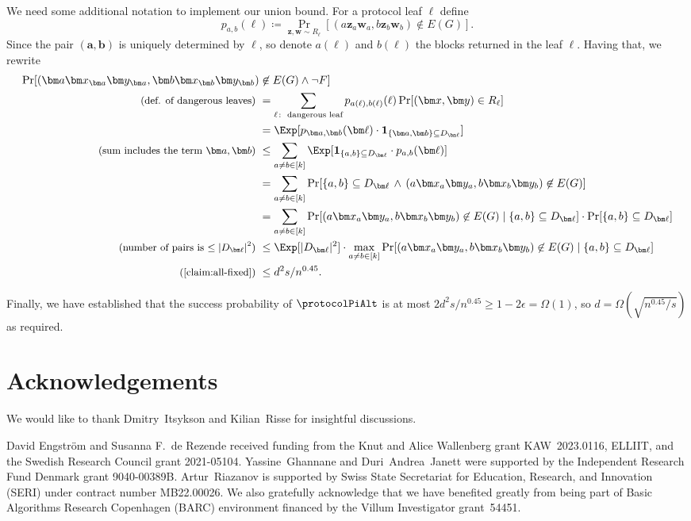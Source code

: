 We need some additional notation to implement our union bound. For a protocol leaf $\ell$ define 
\[p_{a,b}(\ell) \coloneqq \Pr_{\bm z, \bm w \sim R_\ell}[(a \bm z_{a} \bm w_{ a}, b \bm z_b \bm w_b) \not\in E(G)].\]
 Since the pair $(\bm a, \bm b)$ is uniquely determined by $\bm \ell$, so denote $a(\ell)$ and $b(\ell)$ the blocks returned in the leaf $\ell$. 
Having that, we rewrite
\begin{align*}
    \Pr[(\bm a \bm x_{\bm a} \bm y_{\bm a}, \bm b \bm x_{\bm b} \bm y_{\bm b})& \not\in E(G) \land \lnot F] \\
   \text{\small (def. of dangerous leaves) } &=
    \sum_{\ell\colon \text{ dangerous leaf}} p_{a(\ell),b(\ell)}(\ell) \Pr[(\bm x, \bm y) \in R_\ell]\\
    &=
    \Exp[p_{\bm a, \bm b}(\bm \ell) \cdot \mathbf{1}_{\{\bm a, \bm b\} \subseteq D_{\bm \ell}}]\\
   \text{\small (sum includes the term $\bm a, \bm b$) } &\le \sum_{a \neq b \in [k]} \Exp[\mathbf{1}_{\{a,b\} \subseteq D_{\bm \ell}} \cdot p_{a,b}(\bm \ell)]\\
    &= \sum_{a \neq b \in [k]} \Pr[\{a,b\} \subseteq D_{\bm \ell} \,\land\,(a \bm x_a \bm y_a, b \bm x_b \bm y_b) \not\in E(G)]\\
    &= \sum_{a \neq b \in [k]} \Pr[(a \bm x_a \bm y_a, b \bm x_b \bm y_b) \not\in E(G) \mid \{a,b\} \subseteq D_{\bm \ell}] \cdot \Pr[\{a,b\} \subseteq D_{\bm \ell}]\\
   \text{\small (number of pairs is $\le |D_{\bm\ell}|^2$) } &\le \Exp[|D_{\bm \ell}|^2] \cdot \max_{a \neq b \in [k]}  \Pr[(a \bm x_a \bm y_a, b \bm x_b \bm y_b) \not\in E(G) \mid \{a,b\} \subseteq D_{\bm \ell}] \\ 
   \text{\small (\autoref{claim:all-fixed}) }&\le d^2 s / n^{0.45}.
\end{align*}


Finally, we have established that the success probability of $\protocolPiAlt$ is at most $2 d^2 s/ n^{0.45} \ge 1 - 2\epsilon = \Omega(1)$, so $d = \Omega(\sqrt{n^{0.45} / s})$ as required.
\section*{Acknowledgements}
\label{sec:acknowledgements}
We would like to thank 
Dmitry~Itsykson and 
Kilian~Risse for insightful  
discussions.

David Engström and Susanna F.\ de Rezende received funding from the Knut and Alice Wallenberg grant \mbox{KAW 2023.0116}, ELLIIT, and the Swedish Research Council grant 
\mbox{2021-05104}.
Yassine~Ghannane and Duri~Andrea~Janett were supported by
the Independent Research Fund Denmark grant \mbox{9040-00389B}.
Artur~Riazanov is supported by Swiss
State Secretariat for Education, Research, and Innovation (SERI) under contract number MB22.00026.
We also gratefully acknowledge that we have benefited greatly from being part of Basic Algorithms Research Copenhagen (BARC) environment financed by the Villum Investigator grant~54451.
